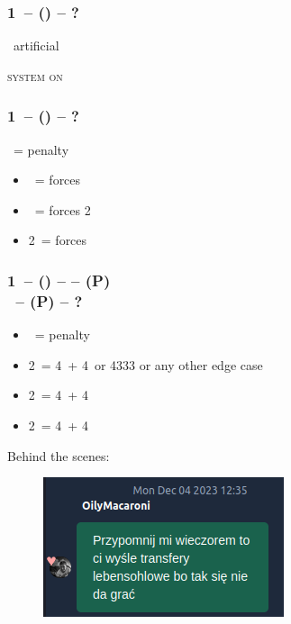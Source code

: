 \documentclass[12pt, a4paper]{article}
\begin{document}
\subsubsection*{1\ntx\ -- (\alrts{\dbl}) -- ?}
\dbl\ artificial

\textsc{system on}

\subsubsection*{1\ntx\ -- (\dbl) -- ?}
\dbl\ = penalty
\begin{itemize}
    \item \pass\ = forces \rdbl
    \item \rdbl\ = forces 2\clubs
    \item 2\ = forces 
\end{itemize}

\subsubsection*{1\ntx\ -- (\dbl) --  -- (P)\\
                \rdbl\ -- (P) -- ?}
\begin{itemize}
    \item \pass\ = penalty
    \item 2\clubs\ = 4\clubs\ + 4\ or 4333 or any other edge case
    \item 2\diams\ = 4\diams\ + 4\major
    \item 2\hearts\ = 4\hearts\ + 4\spades
\end{itemize}

Behind the scenes:
\begin{figure}[H]
    \includegraphics[width=0.4\linewidth]{cuebids2.png}
\end{figure}
\end{document}
